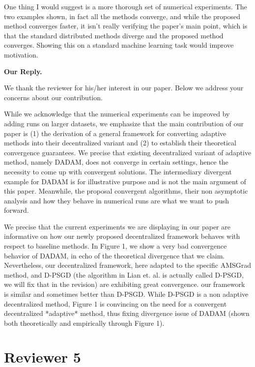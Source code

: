 \documentclass{article} %
\begin{document}
One thing I would suggest is a more thorough set of numerical experiments. The two examples shown, in fact all the methods converge, and while the proposed method converges faster, it isn't really verifying the paper's main point, which is that the standard distributed methods diverge and the proposed method converges. Showing this on a standard machine learning task would improve motivation.


\textbf{Our Reply.}

We thank the reviewer for his/her interest in our paper. Below we address your concerns about our contribution. 

While we acknowledge that the numerical experiments can be improved by adding runs on larger datasets, we emphasize that the main contribution of our paper is (1) the derivation of a general framework for converting adaptive methods into their decentralized variant and (2) to establish their theoretical convergence guarantees.
We precise that existing decentralized variant of adaptive method, namely DADAM, does not converge in certain settings, hence the necessity to come up with convergent solutions.
The intermediary divergent example for DADAM is for illustrative purpose and is not the main argument of this paper.
Meanwhile, the proposal convergent algorithms, their non asymptotic analysis and how they behave in numerical runs are what we want to push forward.

We precise that the current experiments we are displaying in our paper are informative on how our newly proposed decentralized framework behaves with respect to baseline methods.
In Figure 1, we show a very bad convergence behavior of DADAM, in echo of the theoretical divergence that we claim.
Nevertheless, our decentralized framework, here adapted to the specific AMSGrad method, and D-PSGD (the algorithm in Lian et. al. is actually called D-PSGD, we will fix that in the revision) are exhibiting great convergence. our framework is similar and sometimes better than D-PSGD. 
While D-PSGD is a non adaptive decentralized method, Figure 1 is convincing on the need for a convergent decentralized *adaptive* method, thus fixing divergence issue of DADAM (shown both theoretically and empirically through Figure 1). 

\section{Reviewer 5}
\vspace{-0.1in}
\end{document}
